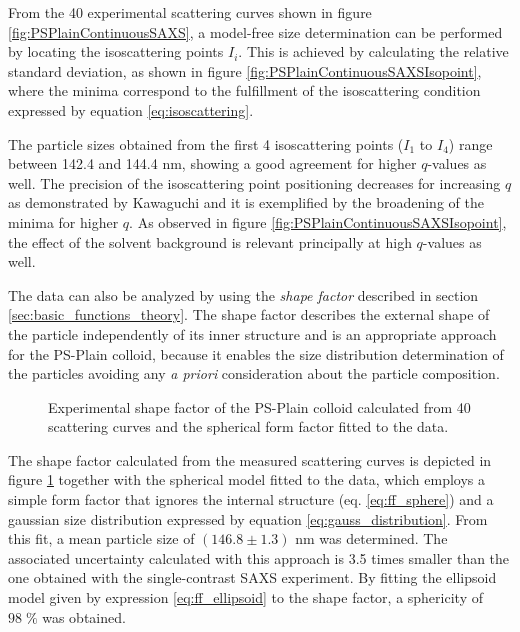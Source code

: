 From the 40 experimental scattering curves shown in figure \ref{fig:PSPlainContinuousSAXS}, a model-free size determination can be performed by locating the isoscattering points $I_i$. This is achieved by calculating the relative standard deviation, as shown in figure \ref{fig:PSPlainContinuousSAXSIsopoint}, where the minima correspond to the fulfillment of the isoscattering condition expressed by equation \ref{eq:isoscattering}.

The particle sizes obtained from the first 4 isoscattering points ($I_1$ to $I_4$) range between 142.4 and 144.4 nm, showing a good agreement for higher $q$-values as well. The precision of the isoscattering point positioning decreases for increasing $q$ as demonstrated by Kawaguchi\citep{kawaguchi_isoscattering_1992} and it is exemplified by the broadening of the minima for higher $q$. As observed in figure \ref{fig:PSPlainContinuousSAXSIsopoint}, the effect of the solvent background is relevant principally at high $q$-values as well.

The data can also be analyzed by using the \emph{shape factor} described in section \ref{sec:basic_functions_theory}. The shape factor describes the external shape of the particle independently of its inner structure and is an appropriate approach for the PS-Plain colloid, because it enables the size distribution determination of the particles avoiding any \emph{a priori} consideration about the particle composition.

\begin{figure}
	\begin{center}
		
	\end{center}
	\caption[Experimental shape factor of the PS-Plain colloid.]{Experimental shape factor of the PS-Plain colloid calculated from 40 scattering curves and the spherical form factor fitted to the data.}
	\label{fig:PSPlainResonantTerm}
\end{figure}

The shape factor calculated from the measured scattering curves is depicted in figure \ref{fig:PSPlainResonantTerm} together with the spherical model fitted to the data, which employs a simple form factor that ignores the internal structure (eq. \ref{eq:ff_sphere}) and a gaussian size distribution expressed by equation \ref{eq:gauss_distribution}. From this fit, a mean particle size of $(146.8\pm1.3)$ nm was determined. The associated uncertainty calculated with this approach is 3.5 times smaller than the one obtained with the single-contrast SAXS experiment. By fitting the ellipsoid model given by expression \ref{eq:ff_ellipsoid} to the shape factor, a sphericity of $98\;\%$ was obtained.

